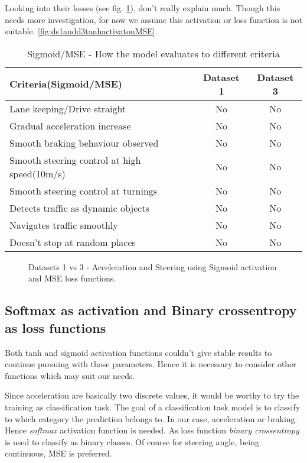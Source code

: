 Looking into their losses (see fig. \ref{fig:ds1andd3SigactivatonMSE}), don't really
explain much. Though this needs more investigation, for now we assume this activation or
loss function is not suitable.
\ref{fig:ds1andd3tanhactivatonMSE}.
\begin{table}[h]
    \centering
\begin{tabular}{lcc}
    \toprule
    Criteria(Sigmoid/MSE) & Dataset 1 & Dataset 3 \\\midrule
    Lane keeping/Drive straight  & No & No  \\
    Gradual acceleration increase & No & No\\
    Smooth braking behaviour observed & No & No \\
    Smooth steering control at high speed(10m/s) & No & No \\
    Smooth steering control at turnings & No & No\\
    Detects traffic as dynamic objects & No & No\\
    Navigates traffic smoothly & No & No\\
    Doesn't stop at random places & No & No \\\bottomrule
\end{tabular}
\caption{Sigmoid/MSE - How the model evaluates to different criteria}
\label{table:sigmse}
\end{table}

\begin{figure}[h]
	\centering
    \def\svgwidth{\textwidth}
    
    \caption{Datasets 1 vs 3 - Acceleration and Steering using Sigmoid activation and MSE loss
    functions.}
    \label{fig:ds1andd3SigactivatonMSE}
\end{figure}

\subsection{Softmax as activation and Binary crossentropy as loss functions}
Both tanh and sigmoid activation functions couldn't give stable results to continue
pursuing with those parameters. Hence it is necessary to consider other functions which
may suit our needs.

Since acceleration are basically two discrete values, it would be worthy to try the
training as classification task. The goal of a classification task model is to classify to
which category the prediction belongs to. In our case, acceleration or braking. Hence
\textit{softmax} activation function is needed. As loss function \textit{binary
crossentropy} is used to classify as binary classes. Of course for steering angle,
being continuous, MSE is preferred.

